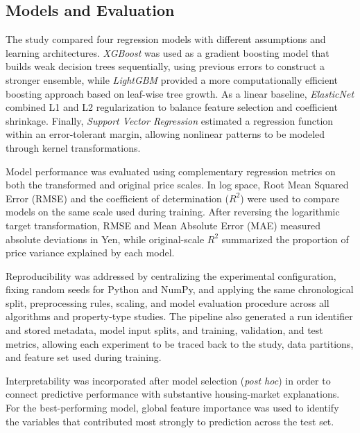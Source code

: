 \documentclass[12pt]{article}
\begin{document}
\subsection{Models and Evaluation}
The study compared four regression models with different assumptions and learning architectures. \textit{XGBoost}
\cite{chen_xgboost} was used as a gradient boosting model that builds weak decision trees sequentially, using previous
errors to construct a stronger ensemble, while \textit{LightGBM} \cite{lightgbm} provided a more computationally
efficient boosting approach based on leaf-wise tree growth. As a linear baseline, \textit{ElasticNet} \cite{Zou2005}
combined L1 and L2 regularization to balance feature selection and coefficient shrinkage. Finally, \textit{Support
Vector Regression} \cite{Smola2004} estimated a regression function within an error-tolerant margin, allowing nonlinear
patterns to be modeled through kernel transformations.

Model performance was evaluated using complementary regression metrics on both the transformed and original price
scales. In log space, Root Mean Squared Error (RMSE) and the coefficient of determination ($R^2$) were used to compare
models on the same scale used during training. After reversing the logarithmic target transformation, RMSE and Mean
Absolute Error (MAE) measured absolute deviations in Yen, while original-scale $R^2$ summarized the proportion of price
variance explained by each model.

Reproducibility was addressed by centralizing the experimental configuration, fixing random seeds for Python and NumPy,
and applying the same chronological split, preprocessing rules, scaling, and model evaluation procedure across all
algorithms and property-type studies. The pipeline also generated a run identifier and stored metadata, model input
splits, and training, validation, and test metrics, allowing each experiment to be traced back to the study, data
partitions, and feature set used during training.

Interpretability was incorporated after model selection (\textit{post hoc}) in order to connect predictive performance
with substantive housing-market explanations. For the best-performing model, global feature importance was used to
identify the variables that contributed most strongly to prediction across the test set.
\end{document}
